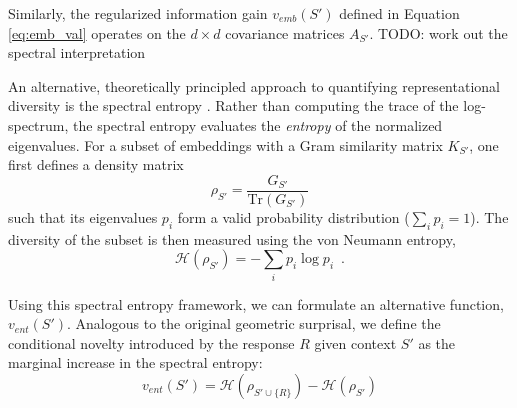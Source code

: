 \documentclass{article}
\begin{document}
Similarly, the regularized information gain $v_{emb}(S')$ defined in Equation \eqref{eq:emb_val} operates on the $d \times d$ covariance matrices $A_{S'}$. TODO: work out the spectral interpretation




An alternative, theoretically principled approach to quantifying representational diversity is the spectral entropy \cite{friedman2022vendi}. Rather than computing the trace of the log-spectrum, the spectral entropy evaluates the \textit{entropy} of the normalized eigenvalues. For a subset of embeddings with a Gram similarity matrix $K_{S'}$, one first defines a density matrix 
$$\rho_{S'} = \frac{G_{S'}}{\text{Tr}(G_{S'})}$$ 
such that its eigenvalues $p_i$ form a valid probability distribution ($\sum_i p_i = 1$). The diversity of the subset is then measured using the von Neumann entropy, 
$$\mathcal{H}(\rho_{S'}) = - \sum_i p_i \log p_i \enspace .$$ 

Using this spectral entropy framework, we can formulate an alternative  function, $v_{ent}(S')$. Analogous to the original geometric surprisal, we define the conditional novelty introduced by the response $R$ given context $S'$ as the marginal increase in the spectral entropy:
$$ v_{ent}(S') = \mathcal{H}(\rho_{S' \cup \{R\}}) - \mathcal{H}(\rho_{S'}) $$
\end{document}
